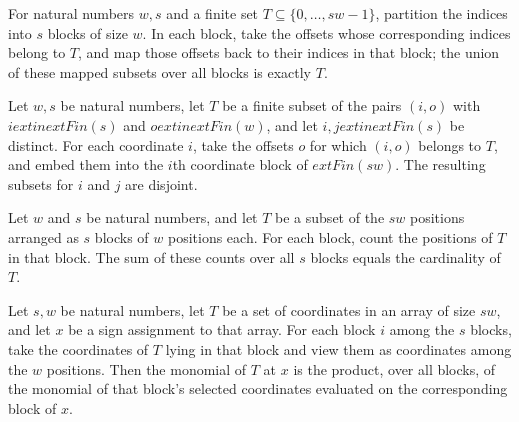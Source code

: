 \begin{theorem}
\label{FABL.tribeFrequencyPart_biUnion}
\leanok
{}
For natural numbers $w,s$ and a finite set $T\subseteq\{0,\ldots,sw-1\}$, partition the
indices into $s$ blocks of size $w$. In each block, take the offsets whose corresponding
indices belong to $T$, and map those offsets back to their indices in that block; the
union of these mapped subsets over all blocks is exactly $T$.
\end{theorem}

\begin{theorem}
\label{FABL.disjoint_tribeOffsetEmbed}
\leanok
{}
Let $w,s$ be natural numbers, let $T$ be a finite subset of the pairs $(i,o)$ with
$i	ext{ in }	ext{Fin}(s)$ and $o	ext{ in }	ext{Fin}(w)$, and let $i,j	ext{ in
}	ext{Fin}(s)$ be distinct. For each coordinate $i$, take the offsets $o$ for which
$(i,o)$ belongs to $T$, and embed them into the $i$th coordinate block of $	ext{Fin}(s
w)$. The resulting subsets for $i$ and $j$ are disjoint.
\end{theorem}

\begin{theorem}
\label{FABL.card_tribeFrequencyPart_sum}
\leanok
{}
Let $w$ and $s$ be natural numbers, and let $T$ be a subset of the $sw$ positions
arranged as $s$ blocks of $w$ positions each. For each block, count the positions of $T$
in that block. The sum of these counts over all $s$ blocks equals the cardinality of
$T$.
\end{theorem}

\begin{theorem}
\label{FABL.monomial_eq_prod_tribeFrequencyPart}
\leanok
{}
Let $s,w$ be natural numbers, let $T$ be a set of coordinates in an array of size $s w$,
and let $x$ be a sign assignment to that array. For each block $i$ among the $s$ blocks,
take the coordinates of $T$ lying in that block and view them as coordinates among the
$w$ positions. Then the monomial of $T$ at $x$ is the product, over all blocks, of the
monomial of that block's selected coordinates evaluated on the corresponding block of
$x$.
\end{theorem}

